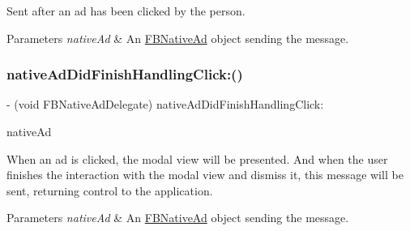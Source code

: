 Sent after an ad has been clicked by the person.


\begin{DoxyParams}{Parameters}
{\em native\+Ad} & An \hyperlink{interfaceFBNativeAd}{F\+B\+Native\+Ad} object sending the message. \\
\hline
\end{DoxyParams}
\mbox{\label{protocolFBNativeAdDelegate_01-p_a94d3846b43d38539da5f28804f75da70}} 
\subsubsection{\texorpdfstring{native\+Ad\+Did\+Finish\+Handling\+Click\+:()}{nativeAdDidFinishHandlingClick:()}\hspace{0.1cm}{\footnotesize\ttfamily [1/5]}}
{\footnotesize\ttfamily -\/ (void F\+B\+Native\+Ad\+Delegate) native\+Ad\+Did\+Finish\+Handling\+Click\+: \begin{DoxyParamCaption}\item[{(\hyperlink{interfaceFBNativeAd}{F\+B\+Native\+Ad} $\ast$)}]{native\+Ad }\end{DoxyParamCaption}}

When an ad is clicked, the modal view will be presented. And when the user finishes the interaction with the modal view and dismiss it, this message will be sent, returning control to the application.


\begin{DoxyParams}{Parameters}
{\em native\+Ad} & An \hyperlink{interfaceFBNativeAd}{F\+B\+Native\+Ad} object sending the message. \\
\hline
\end{DoxyParams}
\mbox{\label{protocolFBNativeAdDelegate_01-p_a94d3846b43d38539da5f28804f75da70}} 
